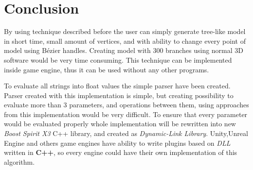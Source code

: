 \documentclass[b5paper,twoside,11pt]{article}
\begin{document}
\section{Conclusion}
By using technique described before the user can simply generate tree-like model in short time, small amount of vertices, and with ability to change every point of model using Bézier handles. Creating model with 300 branches using normal 3D  software would be very time consuming. This technique can be implemented inside game engine, thus it can be used without any other programs.

To evaluate all strings into float values the simple parser have been created.
Parser created with this implementation is simple, but creating possibility to evaluate more than 3 parameters, and operations between them, using approaches from this implementation would be very difficult. To ensure that every parameter would be evaluated properly whole implementation will be rewritten into new \textit{Boost Spirit X3} C++ library, and created as \textit{Dynamic-Link Library}. Unity,Unreal Engine and others game engines have ability to write plugins based on \textit{DLL} written in \textbf{C++}, so every engine could have their own implementation of this algorithm.
\end{document}

